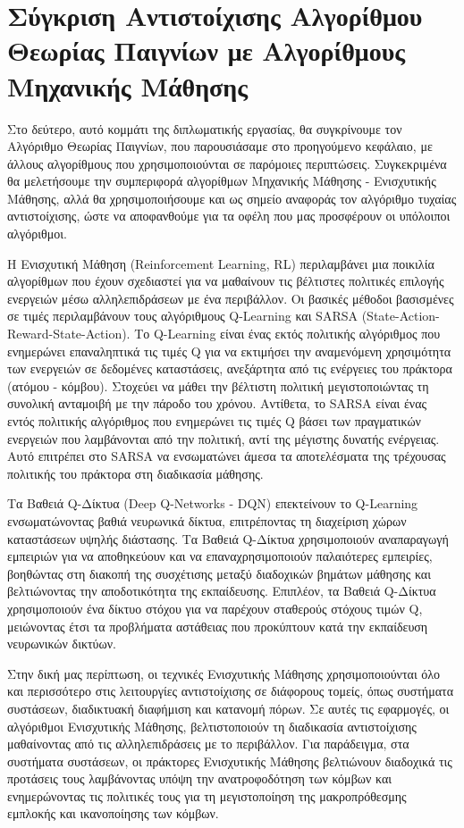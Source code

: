 \chapter{Σύγκριση Αντιστοίχισης Αλγορίθμου Θεωρίας Παιγνίων με Αλγορίθμους Μηχανικής Μάθησης}

Στο δεύτερο, αυτό κομμάτι της διπλωματικής εργασίας, θα συγκρίνουμε τον Αλγόριθμο Θεωρίας Παιγνίων, που παρουσιάσαμε στο προηγούμενο κεφάλαιο, με άλλους αλγορίθμους που χρησιμοποιούνται σε παρόμοιες περιπτώσεις. Συγκεκριμένα θα μελετήσουμε την συμπεριφορά αλγορίθμων Μηχανικής Μάθησης - Ενισχυτικής Μάθησης, αλλά θα χρησιμοποιήσουμε και ως σημείο αναφοράς τον αλγόριθμο τυχαίας αντιστοίχισης, ώστε να αποφανθούμε για τα οφέλη που μας προσφέρουν οι υπόλοιποι αλγόριθμοι.

Η Ενισχυτική Μάθηση (Reinforcement Learning, RL) περιλαμβάνει μια ποικιλία αλγορίθμων που έχουν σχεδιαστεί για να μαθαίνουν τις βέλτιστες πολιτικές επιλογής ενεργειών μέσω αλληλεπιδράσεων με ένα περιβάλλον. Οι βασικές μέθοδοι βασισμένες σε τιμές περιλαμβάνουν τους αλγόριθμους Q-Learning και SARSA (State-Action-Reward-State-Action). Το Q-Learning είναι ένας εκτός πολιτικής αλγόριθμος που ενημερώνει επαναληπτικά τις τιμές Q για να εκτιμήσει την αναμενόμενη χρησιμότητα των ενεργειών σε δεδομένες καταστάσεις, ανεξάρτητα από τις ενέργειες του πράκτορα (ατόμου - κόμβου). Στοχεύει να μάθει την βέλτιστη πολιτική μεγιστοποιώντας τη συνολική ανταμοιβή με την πάροδο του χρόνου. Αντίθετα, το SARSA είναι ένας εντός πολιτικής αλγόριθμος που ενημερώνει τις τιμές Q βάσει των πραγματικών ενεργειών που λαμβάνονται από την πολιτική, αντί της μέγιστης δυνατής ενέργειας. Αυτό επιτρέπει στο SARSA να ενσωματώνει άμεσα τα αποτελέσματα της τρέχουσας πολιτικής του πράκτορα στη διαδικασία μάθησης. 

Τα Βαθειά Q-Δίκτυα (Deep Q-Networks - DQN) επεκτείνουν το Q-Learning ενσωματώνοντας βαθιά νευρωνικά δίκτυα, επιτρέποντας τη διαχείριση χώρων καταστάσεων υψηλής διάστασης. Τα Βαθειά Q-Δίκτυα χρησιμοποιούν αναπαραγωγή εμπειριών για να αποθηκεύουν και να επαναχρησιμοποιούν παλαιότερες εμπειρίες, βοηθώντας στη διακοπή της συσχέτισης μεταξύ διαδοχικών βημάτων μάθησης και βελτιώνοντας την αποδοτικότητα της εκπαίδευσης. Επιπλέον, τα Βαθειά Q-Δίκτυα χρησιμοποιούν ένα δίκτυο στόχου για να παρέχουν σταθερούς στόχους τιμών Q, μειώνοντας έτσι τα προβλήματα αστάθειας που προκύπτουν κατά την εκπαίδευση νευρωνικών δικτύων. 

Στην δική μας περίπτωση, οι τεχνικές Ενισχυτικής Μάθησης χρησιμοποιούνται όλο και περισσότερο στις λειτουργίες αντιστοίχισης σε διάφορους τομείς, όπως συστήματα συστάσεων, διαδικτυακή διαφήμιση και κατανομή πόρων. Σε αυτές τις εφαρμογές, οι αλγόριθμοι Ενισχυτικής Μάθησης, βελτιστοποιούν τη διαδικασία αντιστοίχισης μαθαίνοντας από τις αλληλεπιδράσεις με το περιβάλλον. Για παράδειγμα, στα συστήματα συστάσεων, οι πράκτορες Ενισχυτικής Μάθησης βελτιώνουν διαδοχικά τις προτάσεις τους λαμβάνοντας υπόψη την ανατροφοδότηση των κόμβων και ενημερώνοντας τις πολιτικές τους για τη μεγιστοποίηση της μακροπρόθεσμης εμπλοκής και ικανοποίησης των κόμβων. 

